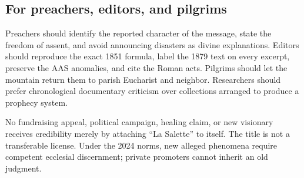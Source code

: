 \subsection{For preachers, editors, and pilgrims}

Preachers should identify the reported character of the message, state the freedom of assent, and avoid announcing disasters as divine explanations. Editors should reproduce the exact 1851 formula, label the 1879 text on every excerpt, preserve the AAS anomalies, and cite the Roman acts. Pilgrims should let the mountain return them to parish Eucharist and neighbor. Researchers should prefer chronological documentary criticism over collections arranged to produce a prophecy system.

No fundraising appeal, political campaign, healing claim, or new visionary receives credibility merely by attaching ``La Salette'' to itself. The title is not a transferable license. Under the 2024 norms, new alleged phenomena require competent ecclesial discernment; private promoters cannot inherit an old judgment.

